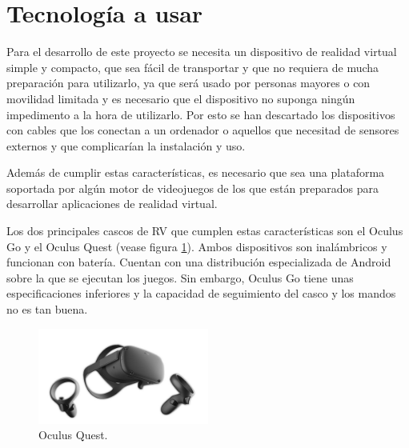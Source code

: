 




\section{Tecnología a usar}



Para el desarrollo de este proyecto se necesita un dispositivo de realidad virtual simple y compacto, que sea fácil de transportar y que no requiera de mucha preparación para utilizarlo, ya que será usado por personas mayores o con movilidad limitada y es necesario que el dispositivo no suponga ningún impedimento a la hora de utilizarlo. Por esto se han descartado los dispositivos con cables que los conectan a un ordenador o aquellos que necesitad de sensores externos y que complicarían la instalación y uso.

Además de cumplir estas características, es necesario que sea una plataforma soportada por algún motor de videojuegos de los que están preparados para desarrollar aplicaciones de realidad virtual.

Los dos principales cascos de RV que cumplen estas características son el Oculus Go y el Oculus Quest (vease figura \ref{fig:TU_oculusQuest}). Ambos dispositivos son inalámbricos y funcionan con batería. Cuentan con una distribución especializada de Android sobre la que se ejecutan los juegos. Sin embargo, Oculus Go tiene unas especificaciones inferiores y la capacidad de seguimiento del casco y los mandos no es tan buena.

\begin{figure}
  \centering
\includegraphics[width=0.5\textwidth]{03.EstudioProblema/03.TecnologiaAUsar/00.Figuras/01.meta_quest_2.jpg}
    \caption{Oculus Quest. \cite{EA_img_oculusQuest}}
    \label{fig:TU_oculusQuest}
\end{figure}

